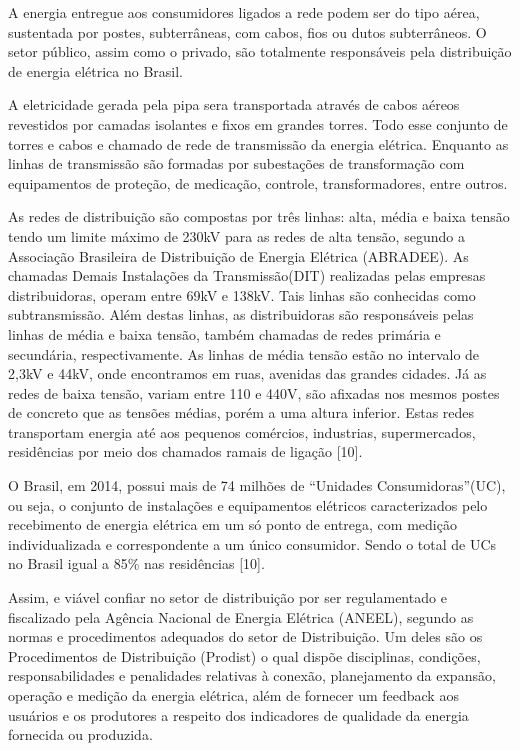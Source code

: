 A energia entregue aos consumidores ligados a rede podem ser do tipo aérea, sustentada por postes, subterrâneas, com cabos, fios ou dutos subterrâneos. O setor público, assim como o privado, são totalmente responsáveis pela distribuição de energia elétrica no Brasil. 

A eletricidade gerada pela pipa sera transportada através de cabos aéreos revestidos por camadas isolantes e fixos em grandes torres. Todo esse conjunto de torres e cabos e chamado de rede de transmissão da energia elétrica. Enquanto as linhas de transmissão são formadas por subestações de transformação com equipamentos de proteção, de medicação, controle, transformadores, entre outros. 

As redes de distribuição são compostas por três linhas: alta, média e baixa tensão tendo um limite máximo de 230kV para as redes de alta tensão, segundo a Associação Brasileira de Distribuição de Energia Elétrica (ABRADEE). As chamadas Demais Instalações da Transmissão(DIT) realizadas pelas empresas distribuidoras, operam entre 69kV e 138kV.  Tais linhas são conhecidas como subtransmissão. Além destas linhas, as distribuidoras são responsáveis pelas linhas de média e baixa tensão, também chamadas de redes primária e secundária, respectivamente. As linhas de média tensão estão no intervalo de 2,3kV e 44kV, onde encontramos em ruas, avenidas das grandes cidades. Já as redes de baixa tensão, variam entre 110 e 440V, são afixadas nos mesmos postes de concreto que as tensões médias, porém a uma altura inferior. Estas redes transportam energia até aos pequenos comércios, industrias, supermercados, residências por meio dos chamados ramais de ligação [10]. 

O Brasil, em 2014, possui mais de 74 milhões de “Unidades Consumidoras”(UC), ou seja, o conjunto de instalações e equipamentos elétricos caracterizados pelo recebimento de energia elétrica em um só ponto de entrega, com medição individualizada e correspondente a um único consumidor. Sendo o total de UCs no Brasil igual a 85\% nas residências [10]. 

Assim, e viável confiar no setor de distribuição por ser regulamentado e fiscalizado pela Agência Nacional de Energia Elétrica (ANEEL), segundo as normas e procedimentos adequados do setor de Distribuição. Um deles são os Procedimentos de Distribuição (Prodist) o qual dispõe disciplinas, condições, responsabilidades e penalidades relativas à conexão, planejamento da expansão, operação e medição da energia elétrica, além de fornecer um feedback aos usuários e os produtores a respeito dos indicadores de qualidade da energia fornecida ou produzida.


